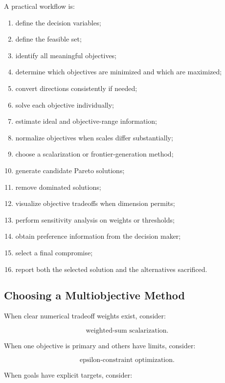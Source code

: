 A practical workflow is:

\begin{enumerate}
    \item define the decision variables;
    \item define the feasible set;
    \item identify all meaningful objectives;
    \item determine which objectives are minimized and which are
          maximized;
    \item convert directions consistently if needed;
    \item solve each objective individually;
    \item estimate ideal and objective-range information;
    \item normalize objectives when scales differ substantially;
    \item choose a scalarization or frontier-generation method;
    \item generate candidate Pareto solutions;
    \item remove dominated solutions;
    \item visualize objective tradeoffs when dimension permits;
    \item perform sensitivity analysis on weights or thresholds;
    \item obtain preference information from the decision maker;
    \item select a final compromise;
    \item report both the selected solution and the alternatives sacrificed.
\end{enumerate}

\subsection{Choosing a Multiobjective Method}
\label{subsec:choosing-multiobjective-method}

When clear numerical tradeoff weights exist, consider:

\[
\boxed{
\text{weighted-sum scalarization}.
}
\]

When one objective is primary and others have limits, consider:

\[
\boxed{
\text{epsilon-constraint optimization}.
}
\]

When goals have explicit targets, consider:

